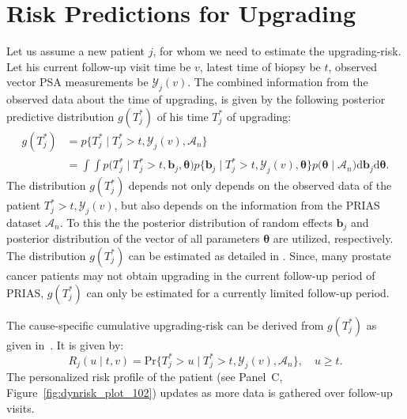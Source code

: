 \section{Risk Predictions for Upgrading}
\label{sec:param_estimates_jm_fit_prias}
Let us assume a new patient $j$, for whom we need to estimate the upgrading-risk. Let his current follow-up visit time be $v$, latest time of biopsy be $t$, observed vector PSA measurements be $\mathcal{Y}_{j}(v)$. The combined information from the observed data about the time of upgrading, is given by the following posterior predictive distribution $g(T^*_j)$ of his time $T^*_j$ of upgrading:
\begin{equation*}
\label{eq:post_pred_dist}
\begin{aligned}
g(T^*_j) &= p\big\{T^*_j \mid T^*_j > t, \mathcal{Y}_{j}(v), \mathcal{A}_n\big\}\\
&= \int \int p\big(T^*_j \mid T^*_j > t, \boldsymbol{b}_j, \boldsymbol{\theta}\big) p\big\{\boldsymbol{b}_j \mid T^*_j>t, \mathcal{Y}_{j}(v), \boldsymbol{\theta}\big\}p\big(\boldsymbol{\theta} \mid \mathcal{A}_n\big) \mathrm{d} \boldsymbol{b}_j \mathrm{d} \boldsymbol{\theta}.
\end{aligned}
\end{equation*}
The distribution $g(T^*_j)$ depends not only depends on the observed data of the patient $T^*_j > t, \mathcal{Y}_{j}(v)$, but also depends on the information from the PRIAS dataset $\mathcal{A}_n$. To this the the posterior distribution of random effects $\boldsymbol{b}_j$ and posterior distribution of the vector of all parameters $\boldsymbol{\theta}$ are utilized, respectively. The distribution $g(T^*_j)$ can be estimated as detailed in \citet{rizopoulos2017dynamic}. Since, many prostate cancer patients may not obtain upgrading in the current follow-up period of PRIAS, $g(T^*_j)$ can only be estimated for a currently limited follow-up period.

The cause-specific cumulative upgrading-risk can be derived from $g(T^*_j)$ as given in~\citep{rizopoulos2017dynamic}. It is given by:
\begin{equation}
\label{eq:dynamic_risk_prob}
R_j(u \mid t, v) = \mbox{Pr}\big\{T^*_j > u \mid T^*_j > t, \mathcal{Y}_{j}(v), \mathcal{A}_n\big\}, \quad u \geq t.
\end{equation}
The personalized risk profile of the patient (see Panel~C, Figure~\ref{fig:dynrisk_plot_102}) updates as more data is gathered over follow-up visits. 

